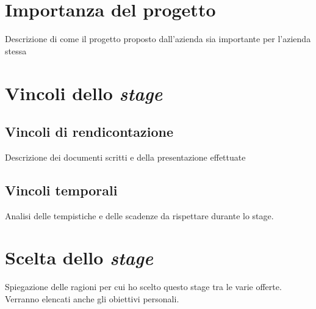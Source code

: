 \section{Importanza del progetto}
Descrizione di come il progetto proposto dall'azienda sia importante per l'azienda stessa

\section{Vincoli dello \textit{stage}}
\subsection{Vincoli di rendicontazione}
Descrizione dei documenti scritti e della presentazione effettuate
\subsection{Vincoli temporali}
Analisi delle tempistiche e delle scadenze da rispettare durante lo stage.


\section{Scelta dello \textit{stage}}
Spiegazione delle ragioni per cui ho scelto questo stage tra le varie offerte.
Verranno elencati anche gli obiettivi personali.
